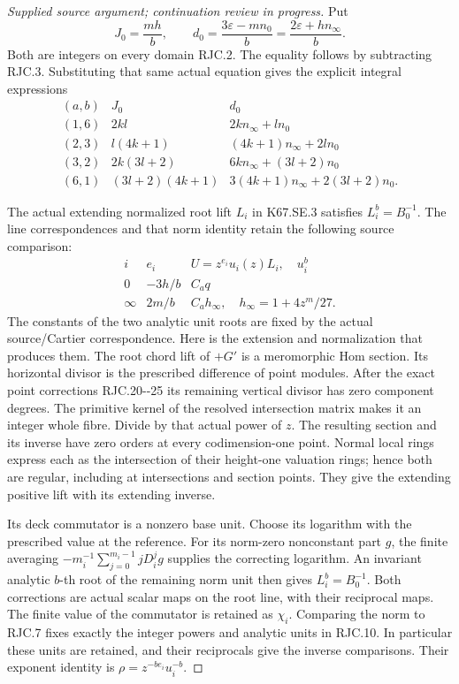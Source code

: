 \begin{proof}[Supplied source argument; continuation review in progress]
Put
\[
 J_0=\frac{mh}{b},\qquad
 d_0=\frac{3\varepsilon-mn_0}{b}
     =\frac{2\varepsilon+hn_\infty}{b}.                              \tag{RJC.8}
\]
Both are integers on every domain RJC.2. The equality follows by
subtracting RJC.3. Substituting that same actual equation gives the
explicit integral expressions
\[
\begin{array}{c|c|c}
(a,b)&J_0&d_0\\ \hline
(1,6)&2kl&2kn_\infty+ln_0\\
(2,3)&l(4k+1)&(4k+1)n_\infty+2ln_0\\
(3,2)&2k(3l+2)&6kn_\infty+(3l+2)n_0\\
(6,1)&(3l+2)(4k+1)&3(4k+1)n_\infty+2(3l+2)n_0.
\end{array}                                                        \tag{RJC.9}
\]

The actual extending normalized root lift \(L_i\) in K67.SE.3 satisfies
\(L_i^b=B_0^{-1}\). The line correspondences and that norm identity
retain the following source comparison:
\[
\begin{array}{c|c|c}
i&e_i&U=z^{e_i}u_i(z)L_i,\quad u_i^b\\ \hline
0&-3h/b&C_aq\\
\infty&2m/b&C_a h_\infty,\quad h_\infty=1+4z^m/27.
\end{array}                                                        \tag{RJC.10}
\]
The constants of the two analytic unit roots are fixed by the actual
source/Cartier correspondence. Here is the extension and normalization
that produces them. The root chord lift of \(+G'\) is a meromorphic
Hom section. Its horizontal divisor is the prescribed difference of
point modules. After the exact point corrections RJC.20-\/-25 its
remaining vertical divisor has zero component degrees. The primitive
kernel of the resolved intersection matrix makes it an integer
whole fibre. Divide by that actual power of \(z\).
The resulting section and its inverse have zero orders at every
codimension-one point. Normal local rings express each as the
intersection of their height-one valuation rings; hence both are
regular, including at intersections and section points. They give
the extending positive lift with its extending inverse.

Its deck commutator is a nonzero base unit. Choose its logarithm
with the prescribed value at the reference. For its norm-zero
nonconstant part \(g\), the finite averaging
\(-m_i^{-1}\sum_{j=0}^{m_i-1}jD_i^jg\) supplies the correcting
logarithm. An invariant analytic \(b\)-th root of the remaining
norm unit then gives \(L_i^b=B_0^{-1}\). Both corrections are
actual scalar maps on the root line, with their reciprocal maps.
The finite value of the commutator is retained as \(\chi_i\).
Comparing the norm to RJC.7 fixes exactly the integer powers
and analytic units in RJC.10. In particular these units are
retained, and their reciprocals give the inverse comparisons.
Their exponent identity is \(\rho=z^{-be_i}u_i^{-b}\).


\end{proof}
